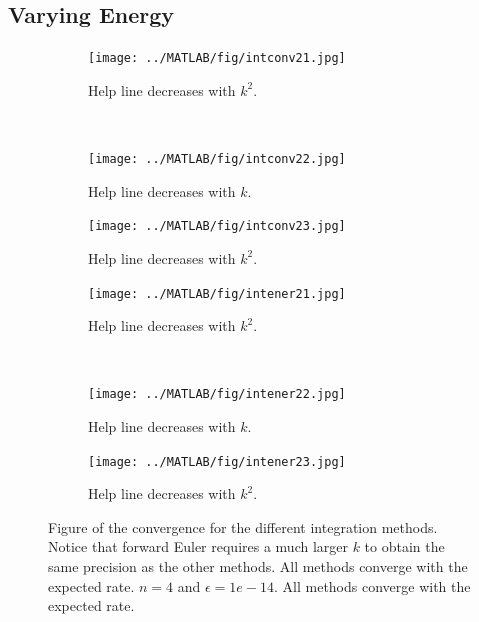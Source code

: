 \subsection{Varying Energy}%
\begin{figure}[H]
        \centering
        \begin{subfigure}[b]{0.30\textwidth}
                \texttt{[image: ../MATLAB/fig/intconv21.jpg]}
                \caption{ Help line decreases with $k^2$. }
                \label{fig:intconv21}
        \end{subfigure}
        ~
        \begin{subfigure}[b]{0.30\textwidth}
                \texttt{[image: ../MATLAB/fig/intconv22.jpg]}
                \caption{ Help line decreases with $k$. }
                \label{fig:intconv22}
        \end{subfigure}
        \begin{subfigure}[b]{0.30\textwidth}
                \texttt{[image: ../MATLAB/fig/intconv23.jpg]}
                \caption{ Help line decreases with $k^2$. }
                \label{fig:intconv23}
        \end{subfigure}
        
                \begin{subfigure}[b]{0.30\textwidth}
                \texttt{[image: ../MATLAB/fig/intener21.jpg]}
                \caption{ Help line decreases with $k^2$. }
                \label{fig:intener21}
        \end{subfigure}
        ~
        \begin{subfigure}[b]{0.30\textwidth}
                \texttt{[image: ../MATLAB/fig/intener22.jpg]}
                \caption{ Help line decreases with $k$. }
                \label{fig:intener22}
        \end{subfigure}
        \begin{subfigure}[b]{0.30\textwidth}
                \texttt{[image: ../MATLAB/fig/intener23.jpg]}
                \caption{ Help line decreases with $k^2$. }
                \label{fig:intener23}
        \end{subfigure}
\caption{Figure of the convergence for the different integration methods. Notice that forward Euler requires a much larger $k$ to obtain the same precision as the other methods. All methods converge with the expected rate. $n = 4$ and $\epsilon  = 1e-14$. All methods converge with the expected rate.}
\label{fig:intconv2}
\end{figure}

